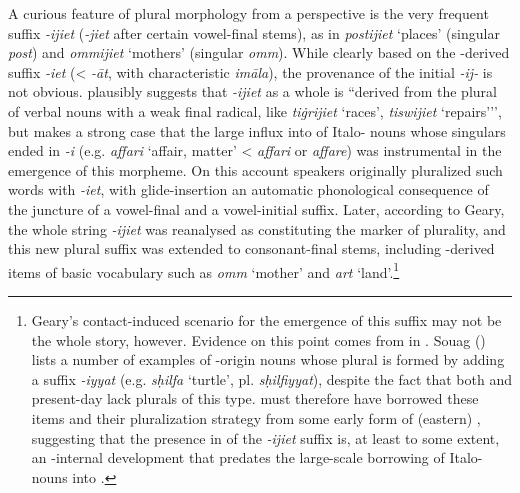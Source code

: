 \documentclass[output=paper]{langsci/langscibook}
\begin{document}
A curious feature of  plural morphology from a   perspective is the very frequent suffix \textit{-ijiet} (\textit{-jiet} after certain vowel-final stems), as in \textit{postijiet} `places' (singular \textit{post}) and \textit{ommijiet} `mothers' (singular \textit{omm}). While clearly based on the -derived suffix \textit{-iet} (<  \textit{-\={a}t}, with characteristic  \textit{im\={a}la}), the provenance of the initial \textit{-ij-} is not obvious. \cite{mifsud2011} plausibly suggests that \textit{-ijiet} as a whole is ``derived from the plural of verbal nouns with a weak final radical, like \textit{tiġrijiet} `races', \textit{tiswijiet} `repairs’'', but \cite{geary2017} makes a strong case that the large influx into  of Italo- nouns whose singulars ended in \textit{-i} (e.g. \textit{affari} `affair, matter' <  \textit{affari} or  \textit{affare}) was instrumental in the emergence of this morpheme. On this account  speakers originally pluralized such words with \textit{-iet}, with glide-insertion an automatic phonological consequence of the juncture of a vowel-final  and a vowel-initial suffix. Later, according to Geary, the whole string \textit{-ijiet} was reanalysed as constituting the marker of plurality, and this new plural suffix was extended to consonant-final stems, including -derived items of basic vocabulary such as \textit{omm} `mother' and \textit{art} `land'.\footnote{Geary's contact-induced scenario for the emergence of this suffix may not be the whole story, however. Evidence on this point comes from   in  . Souag (\citeyear[74]{Souag2013book}) lists a number of examples of -origin nouns whose plural is formed by adding a suffix \textit{-iyyat} (e.g. \textit{sḥilfa} `turtle', pl. \textit{sḥilfiyyat}), despite the fact that both   and present-day   lack plurals of this type.   must therefore have borrowed these items and their pluralization strategy from some early form of (eastern)  , suggesting that the presence in  of the \textit{-ijiet} suffix is, at least to some extent, an -internal development that predates the large-scale borrowing of Italo- nouns into .} %
\end{document}
